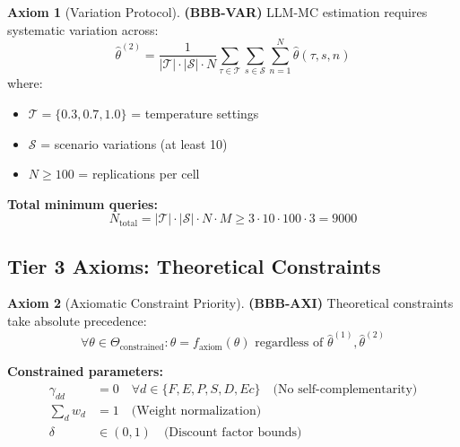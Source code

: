 \documentclass[11pt,a4paper]{article}
\theoremstyle{definition}
\newtheorem{axiom}{Axiom}[section]
\begin{document}
\begin{axiom}[Variation Protocol]
\label{ax:bbb-var}
\textbf{(BBB-VAR)} LLM-MC estimation requires systematic variation across:
\begin{equation}
\hat{\theta}^{(2)} = \frac{1}{|\mathcal{T}| \cdot |\mathcal{S}| \cdot N} \sum_{\tau \in \mathcal{T}} \sum_{s \in \mathcal{S}} \sum_{n=1}^{N} \hat{\theta}(\tau, s, n)
\end{equation}
where:
\begin{itemize}
    \item $\mathcal{T} = \{0.3, 0.7, 1.0\}$ = temperature settings
    \item $\mathcal{S}$ = scenario variations (at least 10)
    \item $N \geq 100$ = replications per cell
\end{itemize}

\textbf{Total minimum queries:}
\begin{equation}
N_{\text{total}} = |\mathcal{T}| \cdot |\mathcal{S}| \cdot N \cdot M \geq 3 \cdot 10 \cdot 100 \cdot 3 = 9000
\end{equation}
\end{axiom}

\subsection{Tier 3 Axioms: Theoretical Constraints}

\begin{axiom}[Axiomatic Constraint Priority]
\label{ax:bbb-axi}
\textbf{(BBB-AXI)} Theoretical constraints take absolute precedence:
\begin{equation}
\forall \theta \in \Theta_{\text{constrained}}: \theta = f_{\text{axiom}}(\theta) \text{ regardless of } \hat{\theta}^{(1)}, \hat{\theta}^{(2)}
\end{equation}

\textbf{Constrained parameters:}
\begin{align}
\gamma_{dd} &= 0 \quad \forall d \in \{F, E, P, S, D, Ec\} \quad \text{(No self-complementarity)} \\
\sum_d w_d &= 1 \quad \text{(Weight normalization)} \\
\delta &\in (0, 1) \quad \text{(Discount factor bounds)}
\end{align}
\end{axiom}
\end{document}
